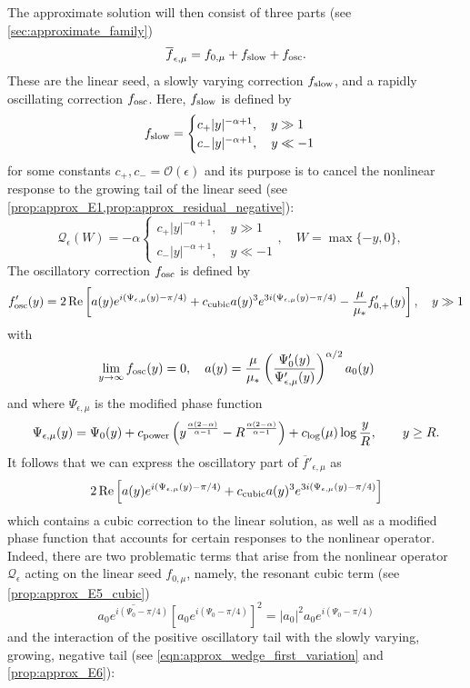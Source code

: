 \documentclass[11pt]{amsart}
\theoremstyle{definition}
\theoremstyle{remark}
\numberwithin{equation}{section}
\newcommand{\mc}[1]{\mathcal{#1}}
\newcommand{\ov}[1]{\overline{#1}}
\begin{document}
The approximate solution will then consist of three parts (see \cref{sec:approximate_family})
\[\ov{f}_{\epsilon, \mu} = f_{0, \mu} + f_{\textup{slow}} + f_{\textup{osc}}.\]
These are the linear seed, a slowly varying correction $f_{\textup{slow}}$, and a rapidly oscillating correction $f_{\textup{osc}}$. Here, $f_{\textup{slow}}$ is defined by 
\[f_{\textup{slow}} = \begin{cases}
c_+|y|^{-\alpha + 1}, \quad y \gg 1 \\
c_-|y|^{-\alpha + 1}, \quad y \ll -1
\end{cases} \]
for some constants $c_+,c_- = \mc{O}(\epsilon)$ and its purpose is to cancel the nonlinear response to the growing tail of the linear seed (see \cref{prop:approx_E1,prop:approx_residual_negative}):
\[\mc{Q}_\epsilon(W) = -\alpha \begin{cases}
c_+|y|^{-\alpha + 1}, \quad y \gg 1 \\
c_-|y|^{-\alpha + 1}, \quad y \ll -1
\end{cases}, \quad W = \max\{-y, 0\}, \quad \]
The oscillatory correction $f_{\textup{osc}}$ is defined by
\[f_{\textup{osc}}'(y) = 2\operatorname{Re}\left[a(y)e^{i(\Psi_{\epsilon,\mu}(y)-\pi/4)} + c_{\textup{cubic}}a(y)^3e^{3i(\Psi_{\epsilon,\mu}(y)-\pi/4)} - \frac{\mu}{\mu_*}f_{0,+}'(y)\right],\quad y \gg 1\]
with
\[\lim_{y\to\infty}f_{\textup{osc}}(y) = 0, \quad a(y) = \frac{\mu}{\mu_*}\left(\frac{\Psi_0'(y)}{\Psi_{\epsilon,\mu}'(y)}\right)^{\alpha/2}a_0(y)\]
and where $\Psi_{\epsilon, \mu}$ is the modified phase function 
\[\Psi_{\epsilon,\mu}(y)=\Psi_0(y)+c_{\textup{power}}\left(y^{\frac{\alpha(2 - \alpha)}{\alpha - 1}}-R^{\frac{\alpha(2 - \alpha)}{\alpha - 1}}\right)+c_{\textup{log}}(\mu)\log\frac{y}{R},\qquad y\geq R.\]
It follows that we can express the oscillatory part of $\ov{f}'_{\epsilon, \mu}$ as
\[2\operatorname{Re}\left[a(y)e^{i(\Psi_{\epsilon,\mu}(y)-\pi/4)} + c_{\textup{cubic}}a(y)^3e^{3i(\Psi_{\epsilon,\mu}(y)-\pi/4)}\right]\]
which contains a cubic correction to the linear solution, as well as a modified phase function that accounts for certain responses to the nonlinear operator. Indeed, there are two problematic terms that arise from the nonlinear operator $\mc{Q}_\epsilon$ acting on the linear seed $f_{0, \mu}$, namely, the resonant cubic term (see \cref{prop:approx_E5_cubic})
\[\ov{a_0e^{i(\Psi_{0} - \pi/4)}}\left[a_0 e^{i(\Psi_{0} - \pi/4)}\right]^2 = |a_0|^2a_0e^{i(\Psi_{0} - \pi/4)}\]
and the interaction of the positive oscillatory tail with the slowly varying, growing, negative tail (see \eqref{eqn:approx_wedge_first_variation} and \cref{prop:approx_E6}):
\end{document}
